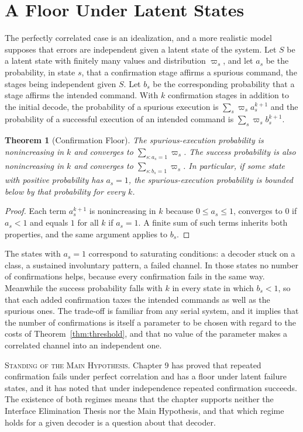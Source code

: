 \documentclass[11pt,twoside,openany]{book}
\newtheorem{theorem}{Theorem}[chapter]
\theoremstyle{definition}
\theoremstyle{remark}
\newenvironment{standing}{\par\medskip\noindent\hrulefill\par\smallskip\noindent\textsc{Standing of the Main Hypothesis.}\enspace}{\par\smallskip\noindent\hrulefill\par\medskip}
\begin{document}
\section{A Floor Under Latent States}

The perfectly correlated case is an idealization, and a more realistic model supposes that errors are independent given a latent state of the system. Let $S$ be a latent state with finitely many values and distribution $\varpi_s$, and let $a_s$ be the probability, in state $s$, that a confirmation stage affirms a spurious command, the stages being independent given $S$. Let $b_s$ be the corresponding probability that a stage affirms the intended command. With $k$ confirmation stages in addition to the initial decode, the probability of a spurious execution is $\sum_s\varpi_s a_s^{k+1}$ and the probability of a successful execution of an intended command is $\sum_s\varpi_s b_s^{k+1}$.

\begin{theorem}[Confirmation Floor]\label{thm:floor}
The spurious-execution probability is nonincreasing in $k$ and converges to $\sum_{s:a_s=1}\varpi_s$. The success probability is also nonincreasing in $k$ and converges to $\sum_{s:b_s=1}\varpi_s$. In particular, if some state with positive probability has $a_s=1$, the spurious-execution probability is bounded below by that probability for every $k$.
\end{theorem}
\begin{proof}
Each term $a_s^{k+1}$ is nonincreasing in $k$ because $0\le a_s\le1$, converges to $0$ if $a_s<1$ and equals $1$ for all $k$ if $a_s=1$. A finite sum of such terms inherits both properties, and the same argument applies to $b_s$.
\end{proof}

The states with $a_s=1$ correspond to saturating conditions: a decoder stuck on a class, a sustained involuntary pattern, a failed channel. In those states no number of confirmations helps, because every confirmation fails in the same way. Meanwhile the success probability falls with $k$ in every state in which $b_s<1$, so that each added confirmation taxes the intended commands as well as the spurious ones. The trade-off is familiar from any serial system, and it implies that the number of confirmations is itself a parameter to be chosen with regard to the costs of Theorem~\ref{thm:threshold}, and that no value of the parameter makes a correlated channel into an independent one.

\begin{standing}
Chapter 9 has proved that repeated confirmation fails under perfect correlation and has a floor under latent failure states, and it has noted that under independence repeated confirmation succeeds. The existence of both regimes means that the chapter supports neither the Interface Elimination Thesis nor the Main Hypothesis, and that which regime holds for a given decoder is a question about that decoder.
\end{standing}
\end{document}
